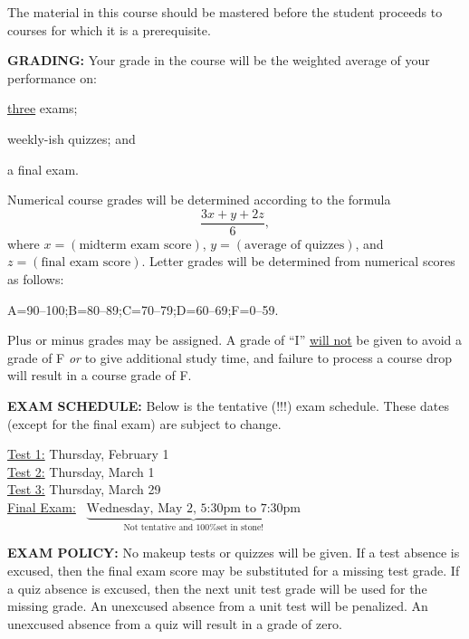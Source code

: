 \documentclass[12pt,oneside]{amsart}
\begin{document}
The material in this course should be mastered before the student proceeds to courses for which it is a prerequisite.


\noindent \textbf{GRADING:} Your grade in the course will be the weighted average of your performance on: \begin{enumerate*}[label=(\alph*)]\item \ul{three} exams; \item weekly-ish quizzes; and \item a final exam.\end{enumerate*}\vspace{-3mm}

Numerical course grades will be determined according to the formula
$$\frac{3x+y+2z}{6},$$
where $x=(\text{midterm exam score})$, $y=(\text{average of quizzes})$, and $z=(\text{final exam score})$. Letter grades will be determined from numerical scores as follows: \vspace{-3mm}
\begin{center}
	A=90--100;\quad\quad\quad B=80--89;\quad\quad\quad C=70--79;\quad\quad\quad D=60--69;\quad\quad\quad F=0--59.
\end{center}\vspace{-3mm}
Plus or minus grades may be assigned. A grade of ``I'' \ul{will not} be given to avoid a grade of F \textit{or} to give additional study time, and failure to process a course drop will result in a course grade of F.

\noindent \textbf{EXAM SCHEDULE:} Below is the tentative (!!!) exam schedule. These dates (except for the final exam) are subject to change.\vspace{-3mm}

\indent \ul{Test 1:} Thursday, February 1
\\[1.5mm]
\indent \ul{Test 2:} Thursday, March 1
\\[1.5mm]
\indent \ul{Test 3:} Thursday, March 29
\\[3mm]
\indent \ul{Final Exam:}\,\,\, $\underbrace{\text{Wednesday, May 2, 5:30pm to 7:30pm}}_\text{Not tentative and 100\% set in stone!}$

\noindent \textbf{EXAM POLICY:} No makeup tests or quizzes will be given. If a test absence is excused, then the final exam score may be substituted for a missing test grade. If a quiz absence is excused, then the next unit test grade will be used for the missing grade. An unexcused absence from a unit test will be penalized. An unexcused absence from a quiz will result in a grade of zero. 
\end{document}
